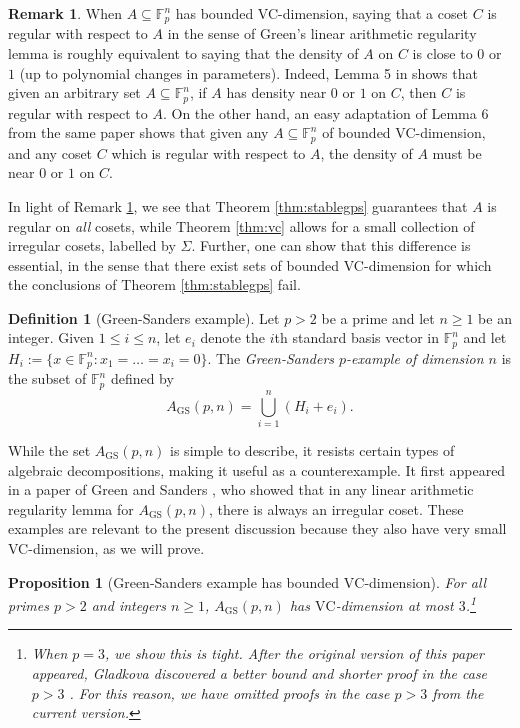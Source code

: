 \documentclass[12pt,oneside,british,a4wide]{amsart}
\newtheorem{proposition}[theorem]{Proposition}
\numberwithin{equation}{section}
\theoremstyle{definition}
\newtheorem{definition}[theorem]{Definition}
\newtheorem{remark}[theorem]{Remark}
\def\F{\mathbb{F}}
\def\VC{\mathrm{VC}}
\def\GS{\mathrm{GS}}
\begin{document}
\begin{remark}\label{rem:vc01}
When $A\subseteq \F_p^n$ has bounded VC-dimension, saying that a coset $C$ is regular with respect to $A$ in the sense of Green's linear arithmetic regularity lemma is roughly equivalent to saying that the density of $A$ on $C$ is close to $0$ or $1$ (up to polynomial changes in parameters).  Indeed, Lemma 5 in \cite{Terry.2019} shows that given an arbitrary set $A\subseteq \F_p^n$, if $A$ has density near $0$ or $1$ on $C$, then $C$ is regular with respect to $A$.  On the other hand, an easy adaptation of Lemma 6 from the same paper shows that given any $A\subseteq \F_p^n$ of bounded VC-dimension, and any coset $C$ which is regular  with respect to $A$, the density of $A$ must be near $0$ or $1$ on $C$. 
\end{remark}

 In light of Remark \ref{rem:vc01}, we see that  Theorem \ref{thm:stablegps} guarantees that $A$ is regular on \emph{all} cosets, while Theorem \ref{thm:vc} allows for a small collection of irregular cosets, labelled by $\Sigma$.  Further, one can show that this difference is essential, in the sense that  there exist sets of bounded VC-dimension for which the conclusions of Theorem \ref{thm:stablegps} fail. 

 

\begin{definition}[Green-Sanders example]\label{def:GS}
Let $p>2$ be a prime and let $n\geq 1$ be an integer. Given $1\leq i\leq n$,  let $e_i$ denote the $i$th standard basis vector in $\F_p^n$ and let $H_i:=\{x\in \mathbb{F}_p^n: x_1=\ldots=x_i=0\}$. The \emph{Green-Sanders $p$-example of dimension $n$} is the subset of $\F_p^n$ defined by
\[A_{\GS}(p,n)=\bigcup_{i=1}^n (H_i+e_i).\]
\end{definition}

While the set $A_{\GS}(p,n)$ is simple to describe, it resists certain types of algebraic decompositions, making it useful as a counterexample.  It  first appeared   in a paper of Green and Sanders \cite{Green.2015qy4}, who showed that in any linear arithmetic regularity lemma for $A_{\GS}(p,n)$,   there is always an irregular coset.   These examples are relevant to the present discussion because they also have very small VC-dimension, as we will prove. 
 

\begin{proposition}[Green-Sanders example has bounded $\VC$-dimension]\label{prop:gs3vc}
For all primes $p>2$ and integers $n\geq 1$, $A_{\GS}(p,n)$ has $\VC$-dimension at most $3$.\footnote{When $p=3$, we show this is tight. After the original version of this paper appeared, Gladkova discovered a better bound and shorter proof in the case $p>3$  \cite{Gladkova.2024}. For this reason, we have omitted proofs in the case  $p>3$ from the current version.}
\end{proposition}
 
\end{document}

